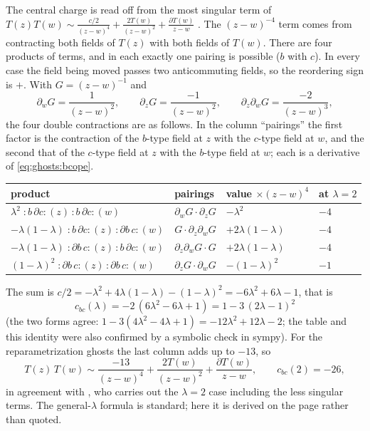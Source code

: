 The central charge is read off from the most singular term of
$T(z)T(w)\sim\frac{c/2}{(z-w)^4}+\frac{2T(w)}{(z-w)^2}+\frac{\partial T(w)}{z-w}$
. The $(z-w)^{-4}$ term comes from contracting both fields
of $T(z)$ with both fields of $T(w)$. There are four products of terms, and in each exactly
one pairing is possible ($b$ with $c$). In every case the field being moved passes two
anticommuting fields, so the reordering sign is $+$. With $G=(z-w)^{-1}$ and
\[
  \partial_wG=\frac{1}{(z-w)^2},\qquad\partial_zG=\frac{-1}{(z-w)^2},\qquad
  \partial_z\partial_wG=\frac{-2}{(z-w)^3},
\]
the four double contractions are as follows. In the column ``pairings'' the first factor is
the contraction of the $b$-type field at $z$ with the $c$-type field at $w$, and the second
that of the $c$-type field at $z$ with the $b$-type field at $w$; each is a derivative of
\cref{eq:ghosts:bcope}.
\begin{center}
\renewcommand{\arraystretch}{1.25}
\begin{tabular}{@{}llll@{}}
\toprule
product & pairings & value $\times(z-w)^4$ & at $\lambda=2$\\
\midrule
$\lambda^2\;{:}b\,\partial c{:}(z)\,{:}b\,\partial c{:}(w)$ &
  $\partial_wG\cdot\partial_zG$ & $-\lambda^2$ & $-4$\\
$-\lambda(1-\lambda)\;{:}b\,\partial c{:}(z)\,{:}\partial b\,c{:}(w)$ &
  $G\cdot\partial_z\partial_wG$ & $+2\lambda(1-\lambda)$ & $-4$\\
$-\lambda(1-\lambda)\;{:}\partial b\,c{:}(z)\,{:}b\,\partial c{:}(w)$ &
  $\partial_z\partial_wG\cdot G$ & $+2\lambda(1-\lambda)$ & $-4$\\
$(1-\lambda)^2\;{:}\partial b\,c{:}(z)\,{:}\partial b\,c{:}(w)$ &
  $\partial_zG\cdot\partial_wG$ & $-(1-\lambda)^2$ & $-1$\\
\bottomrule
\end{tabular}
\end{center}
The sum is $c/2=-\lambda^2+4\lambda(1-\lambda)-(1-\lambda)^2=-6\lambda^2+6\lambda-1$, that is
\begin{equation}\label{eq:ghosts:cbc}
  \boxed{\,c_{bc}(\lambda)=-2\,(6\lambda^2-6\lambda+1)=1-3\,(2\lambda-1)^2\,}
\end{equation}
(the two forms agree: $1-3(4\lambda^2-4\lambda+1)=-12\lambda^2+12\lambda-2$; the table and
this identity were also confirmed by a symbolic check in sympy). For the reparametrization
ghosts the last column adds up to $-13$, so
\begin{equation}\label{eq:ghosts:minus26}
  T(z)\,T(w)\sim\frac{-13}{(z-w)^4}+\frac{2T(w)}{(z-w)^2}+\frac{\partial T(w)}{z-w},
  \qquad c_{bc}(2)=-26,
\end{equation}
in agreement with , who carries out the $\lambda=2$ case
including the less singular terms. The general-$\lambda$ formula is standard; here it is
derived on the page rather than quoted.

